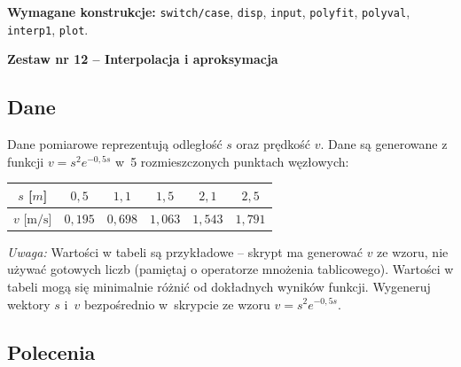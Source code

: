 \documentclass[a4paper,11pt]{article}
\begin{document}
\vspace{0.3cm}
\begin{ramka}
\textbf{Wymagane konstrukcje:}
\texttt{switch/case}, \texttt{disp}, \texttt{input}, \texttt{polyfit}, \texttt{polyval}, \texttt{interp1}, \texttt{plot}.
\end{ramka}

\clearpage
\begin{center}
  {\large\bfseries Zestaw nr 12 \quad -- \quad Interpolacja i aproksymacja}
\end{center}
\hrulefill
\vspace{0.4cm}

\subsection*{Dane}

Dane pomiarowe reprezentują odległość $s$ oraz prędkość $v$.
Dane są generowane z funkcji $v = s^2 e^{-0{,}5s}$ w~5 rozmieszczonych punktach węzłowych:

\begin{center}
\begin{tabular}{c|ccccc}
  \toprule
  $s$ [$m$] & $0{,}5$ & $1{,}1$ & $1{,}5$ & $2{,}1$ & $2{,}5$ \\
  \midrule
  $v$ [$\text{m/s}$] & $0{,}195$ & $0{,}698$ & $1{,}063$ & $1{,}543$ & $1{,}791$ \\
  \bottomrule
\end{tabular}
\end{center}

\medskip
\textit{Uwaga:} Wartości w tabeli są przykładowe – skrypt ma generować $v$ ze wzoru, nie używać gotowych liczb (pamiętaj o operatorze mnożenia tablicowego). Wartości w tabeli mogą się minimalnie różnić od dokładnych wyników funkcji.
Wygeneruj wektory $s$ i~$v$ bezpośrednio w~skrypcie ze wzoru $v = s^2 e^{-0{,}5s}$.

\subsection*{Polecenia}
\end{document}
